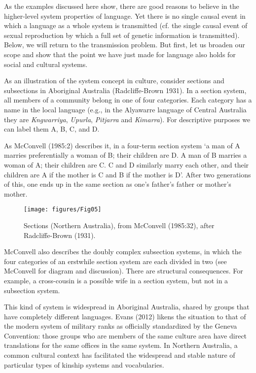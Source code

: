 As the examples discussed here show, there are good reasons to believe 
in the higher-level system properties of language. Yet there is no 
single causal event in which a language as a whole system is transmitted 
(cf. the single causal event of sexual reproduction by which a full set 
of genetic information is transmitted). Below, we will return to the 
transmission problem. But first, let us broaden our scope and show that 
the point we have just made for language also holds for social and 
cultural systems. 



As an illustration of the system concept in culture, consider sections 
and subsections in Aboriginal Australia (Radcliffe-Brown 1931). In a 
section system, all members of a community belong in one of four 
categories. Each category has a name in the local language (e.g., in the 
Alyawarre language of Central Australia they are \textit{Kngwarriya}, 
\textit{Upurla}, \textit{Pitjarra} and \textit{Kimarra}). For 
descriptive purposes we can label them A, B, C, and D. 



As McConvell (1985:2) describes it, in a four-term section system \textquoteleft a man 
of A marries preferentially a woman of B; their children are D. A man of 
B marries a woman of A; their children are C. C and D similarly marry 
each other, and their children are A if the mother is C and B if the 
mother is D'. After two generations of this, one ends up in the same 
section as one's father's father or mother's mother.

\begin{figure}[h!]
\texttt{[image: figures/Fig05]}
\caption{Sections (Northern Australia), from McConvell (1985:32), after 
Radcliffe-Brown (1931). }
\end{figure}







McConvell also describes the doubly complex subsection systems, in which 
the four categories of an erstwhile section system are each divided in 
two (see McConvell for diagram and discussion). There are structural 
consequences. For example, a cross-cousin is a possible wife in a 
section system, but not in a subsection system. 



This kind of system is widespread in Aboriginal Australia, shared by 
groups that have completely different languages. Evans (2012) likens the 
situation to that of the modern system of military ranks as officially 
standardized by the Geneva Convention: those groups who are members of 
the same culture area have direct translations for the same offices in 
the same system. In Northern Australia, a common cultural context has 
facilitated the widespread and stable nature of particular types of 
kinship systems and vocabularies. 



